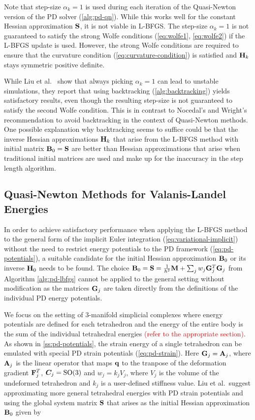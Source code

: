 Note that step-size $\alpha_k = 1$ is 
used during each iteration of the Quasi-Newton version of the PD solver (\cref{alg:pd-qn}).
While this works well for the constant Hessian approximation $\mathbf{S}$, it is not viable in L-BFGS. The step-size $\alpha_k = 1$
is not guaranteed to satisfy the strong Wolfe conditions (\cref{eq:wolfe1}, \cref{eq:wolfe2}) if the L-BFGS update is used. However,
the strong Wolfe conditions are required to ensure that the curvature condition (\cref{eq:curvature-condition}) is satisfied 
and $\mathbf{H}_k$ stays symmetric positive definite. 

While Liu et al.\ \cite{liu2017} show that always picking $\alpha_k = 1$ can lead to
unstable simulations, they report that using backtracking (\cref{alg:backtracking}) yields satisfactory results, even though 
the resulting step-size is not guaranteed to satisfy the second Wolfe condition. This is in contrast to Nocedal's and Wright's
recommendation \cite{nocedal2006} to avoid backtracking in the context of  Quasi-Newton methods. One possible explanation why 
backtracking seems to suffice could be that the inverse 
Hessian approximations $\mathbf{H}_k$ that arise from the L-BFGS method with initial matrix $\mathbf{B}_0 = \mathbf{S}$ are better than
Hessian approximations that arise when traditional initial matrices are used and make up for the inaccuracy in the step length
algorithm.

\subsection{Quasi-Newton Methods for Valanis-Landel Energies}\label{ss:qn-valanis-landel}
In order to achieve satisfactory performance when applying the L-BFGS method to the general form of the implicit Euler integration 
(\cref{eq:variational-implicit}) without the need to restrict energy potentials to the PD framework (\cref{eq:pd-potentials}), a suitable
candidate for the initial Hessian approximation $\mathbf{B}_0$ or its inverse $\mathbf{H}_0$ needs to be found. The choice $\mathbf{B}_0 = 
\mathbf{S} = \frac{1}{h^2}\mathbf{M} + \sum_j w_j \mathbf{G}_j^T \mathbf{G}_j$ from Algorithm \ref{alg:pd-lbfgs} cannot be applied to the general setting 
without modification as the matrices $\mathbf{G}_j$ are taken directly from the definitions of the individual PD energy potentials.

We focus on the setting of 3-manifold simplicial complexes where energy potentials are defined for each tetrahedron and the
energy of the entire body is the sum of the individual tetrahedral energies \textcolor{red}{(refer to the appropriate section)}.
As shown in \cref{ss:pd-potentials}, the strain energy of a single tetrahedron can be emulated with special PD strain 
potentials (\cref{eq:pd-strain}). Here $\mathbf{G}_j = \mathbf{A}_j$, where $\mathbf{A}_j$ is the linear operator that maps $\mathbf{q}$ 
to the tranpose of the deformation gradient $\mathbf{F}^T_j$, $\bm{C}_j = \text{SO}(3)$ and $w_j = k_jV_j$, where $V_j$ is the
volume of the undeformed tetrahedron and $k_j$ is a user-defined stiffness value. 
Liu et al.\ suggest approximating more general tetrahedral energies with PD strain potentials and using the global system
matrix $\mathbf{S}$ that arises as the initial Hessian approximation $\mathbf{B}_0$ given by

